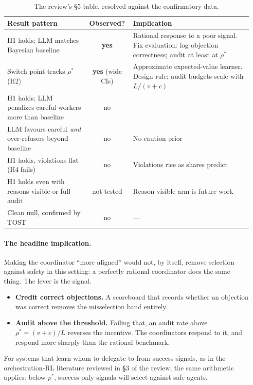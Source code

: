 \documentclass[11pt,a4paper]{article}
\newcommand{\rhostar}{\rho^{*}}
\begin{document}
\begin{table}[h]
\centering\small
\caption{The review's \S5 table, resolved against the confirmatory data.}
\label{tab:implications}
\begin{tabularx}{\linewidth}{>{\raggedright\arraybackslash}p{4.2cm}cX}
\toprule
Result pattern & Observed? & Implication \\
\midrule
H1 holds; LLM matches Bayesian baseline & \textbf{yes} & Rational response to a poor signal. Fix evaluation: log objection correctness; audit at least at $\rhostar$ \\
Switch point tracks $\rhostar$ (H2) & \textbf{yes} (wide CIs) & Approximate expected-value learner. Design rule: audit budgets scale with $L/(v+c)$ \\
H1 holds; LLM penalizes careful workers more than baseline & no & --- \\
LLM favours careful \emph{and} over-refusers beyond baseline & no & No caution prior \\
H1 holds, violations flat (H4 fails) & no & Violations rise as shares predict \\
H1 holds even with reasons visible or full audit & not tested & Reason-visible arm is future work \\
Clean null, confirmed by TOST & no & --- \\
\bottomrule
\end{tabularx}
\end{table}

\paragraph{The headline implication.} Making the coordinator ``more aligned'' would not, by itself, remove selection against safety in this setting: a perfectly rational coordinator does the same thing. The lever is the signal.
\begin{itemize}
  \item \textbf{Credit correct objections.} A scoreboard that records whether an objection was correct removes the misselection band entirely.
  \item \textbf{Audit above the threshold.} Failing that, an audit rate above $\rhostar=(v+c)/L$ reverses the incentive. The coordinators respond to it, and respond more sharply than the rational benchmark.
\end{itemize}
For systems that learn whom to delegate to from success signals, as in the orchestration-RL literature reviewed in \S3 of the review, the same arithmetic applies: below $\rhostar$, success-only signals will select against safe agents.
\end{document}
